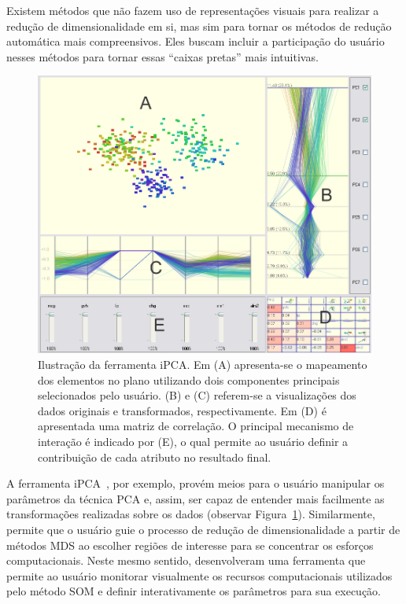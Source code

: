Existem métodos que não fazem uso de representações
visuais para realizar a redução de dimensionalidade em si,
mas sim para tornar os métodos de redução automática mais
compreensivos. Eles buscam incluir a participação do usuário
nesses métodos para tornar essas ``caixas pretas'' mais
intuitivas. 

\begin{figure}[h!]
    \centering
    \includegraphics[width=12cm]{images/ipca.png}
    \caption[iPCA]{Ilustração da ferramenta iPCA. Em (A)
    apresenta-se o mapeamento dos elementos no plano
utilizando dois componentes principais selecionados pelo
usuário. (B) e (C) referem-se a visualizações dos dados
originais e transformados, respectivamente. Em (D) é
apresentada uma matriz de correlação. O principal mecanismo
de interação é indicado por (E), o qual permite ao usuário
definir a contribuição de cada atributo no resultado final.}
    \label{fig:ipca}
\end{figure}

A ferramenta iPCA~\cite{Jeong2009}, por exemplo, provém meios
para o usuário manipular os parâmetros da técnica PCA e,
assim, ser capaz de entender mais facilmente as
transformações realizadas sobre os dados (observar
Figura~\ref{fig:ipca}). Similarmente, \cite{Williams2004}
permite que o usuário guie o processo de redução de
dimensionalidade a partir de métodos MDS ao escolher regiões
de interesse para se concentrar os esforços computacionais.
Neste mesmo sentido, \cite{Schreck2008} desenvolveram uma
ferramenta que permite ao usuário monitorar visualmente os
recursos computacionais utilizados pelo método SOM e definir
interativamente os parâmetros para sua execução.


